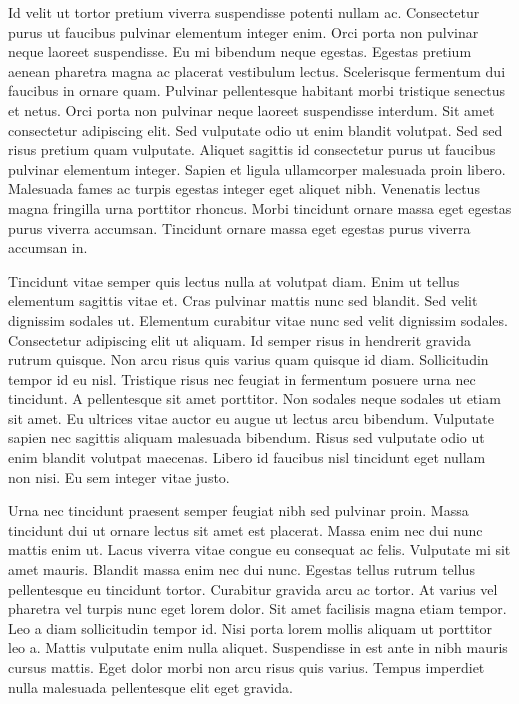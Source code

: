 \documentclass[11pt,a4paper]{article}
\begin{document}
Id velit ut tortor pretium viverra suspendisse potenti nullam ac. Consectetur purus ut faucibus pulvinar elementum integer enim. Orci porta non pulvinar neque laoreet suspendisse. Eu mi bibendum neque egestas. Egestas pretium aenean pharetra magna ac placerat vestibulum lectus. Scelerisque fermentum dui faucibus in ornare quam. Pulvinar pellentesque habitant morbi tristique senectus et netus. Orci porta non pulvinar neque laoreet suspendisse interdum. Sit amet consectetur adipiscing elit. Sed vulputate odio ut enim blandit volutpat. Sed sed risus pretium quam vulputate. Aliquet sagittis id consectetur purus ut faucibus pulvinar elementum integer. Sapien et ligula ullamcorper malesuada proin libero. Malesuada fames ac turpis egestas integer eget aliquet nibh. Venenatis lectus magna fringilla urna porttitor rhoncus. Morbi tincidunt ornare massa eget egestas purus viverra accumsan. Tincidunt ornare massa eget egestas purus viverra accumsan in.

Tincidunt vitae semper quis lectus nulla at volutpat diam. Enim ut tellus elementum sagittis vitae et. Cras pulvinar mattis nunc sed blandit. Sed velit dignissim sodales ut. Elementum curabitur vitae nunc sed velit dignissim sodales. Consectetur adipiscing elit ut aliquam. Id semper risus in hendrerit gravida rutrum quisque. Non arcu risus quis varius quam quisque id diam. Sollicitudin tempor id eu nisl. Tristique risus nec feugiat in fermentum posuere urna nec tincidunt. A pellentesque sit amet porttitor. Non sodales neque sodales ut etiam sit amet. Eu ultrices vitae auctor eu augue ut lectus arcu bibendum. Vulputate sapien nec sagittis aliquam malesuada bibendum. Risus sed vulputate odio ut enim blandit volutpat maecenas. Libero id faucibus nisl tincidunt eget nullam non nisi. Eu sem integer vitae justo.

Urna nec tincidunt praesent semper feugiat nibh sed pulvinar proin. Massa tincidunt dui ut ornare lectus sit amet est placerat. Massa enim nec dui nunc mattis enim ut. Lacus viverra vitae congue eu consequat ac felis. Vulputate mi sit amet mauris. Blandit massa enim nec dui nunc. Egestas tellus rutrum tellus pellentesque eu tincidunt tortor. Curabitur gravida arcu ac tortor. At varius vel pharetra vel turpis nunc eget lorem dolor. Sit amet facilisis magna etiam tempor. Leo a diam sollicitudin tempor id. Nisi porta lorem mollis aliquam ut porttitor leo a. Mattis vulputate enim nulla aliquet. Suspendisse in est ante in nibh mauris cursus mattis. Eget dolor morbi non arcu risus quis varius. Tempus imperdiet nulla malesuada pellentesque elit eget gravida.
\end{document}

